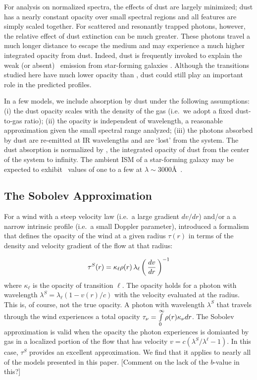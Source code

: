 \documentclass[12pt,preprint]{aastex}
\begin{document}
For analysis on normalized spectra, the effects of dust are largely minimized; 
dust has a nearly constant opacity over small spectral regions and all
features are simply scaled together.
For scattered and resonantly trapped photons, however, the relative effect of dust
extinction can be much greater.  
These photons travel a much longer distance to escape the medium and
may experience a much higher integrated opacity from dust.
Indeed, dust is frequently invoked to
explain the weak (or absent) \lya\ emission from star-forming galaxies
\citep[e.g.][]{shapley03}.  Although the transitions studied here have
much lower opacity than \lya, dust could still play an important role
in the predicted profiles.

In a few models, we include absorption by dust under the following
assumptions:
(i) the dust opacity scales with the density of the gas (i.e.\ we
adopt a fixed dust-to-gas ratio);
(ii) the opacity is independent of wavelength, a reasonable
approximation given the small spectral range analyzed;
(iii) the photons absorbed by dust are re-emitted at IR wavelengths
and are `lost' from the system.  The dust absorption is normalized by \taud, 
the integrated opacity of dust from the center of the system to
infinity.  The ambient ISM of a star-forming galaxy may be expected to exhibit
\taud\ values of one to a few at $\lambda \sim 3000$\AA\ \citep[e.g.][]{dust_again}.

\subsection{The Sobolev Approximation}

For a wind with a steep velocity law (i.e.\ a large gradient $dv/dr$)
and/or a a narrow intrinsic profile (i.e.\ a small Doppler parameter),
\citet{sobolev60} introduced a formalism that defines the opacity of
the wind at a given radius $\tau(r)$ in terms of the density and
velocity gradient of the flow at that radius:

\begin{equation}
\tau^S(r) = \kappa_\ell \rho(r) \, \lambda_\ell \left ( \, \frac{dv}{dr}
\, \right )^{-1}
\label{eqn:Sobolev}
\end{equation}
where $\kappa_\ell$ is the opacity of transition $\ell$.  The opacity
holds for a photon with wavelength $\lambda^S
= \lambda_\ell (1-v(r)/c)$ with the velocity evaluated at the radius.
This is, of course, not the true opacity.
A photon with wavelength $\lambda^S$ that travels through the wind 
experiences a total opacity 
$\tau_\nu = \int\limits_0^\infty \rho(r) \kappa_\nu dr$.  The Sobolev
approximation is valid when the opacity the photon experiences is
domianted by gas in a localized portion of the flow that has velocity
$v = c(\lambda^S/\lambda^\ell - 1)$.  In this case, $\tau^S$ provides an
excellent approximation.  We find that it applies to nearly all of the
models presented in this paper.  [Comment on the lack of the $b$-value
in this?]
\end{document}

